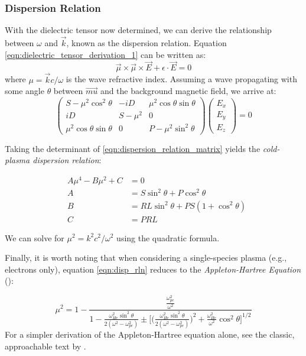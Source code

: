 \subsubsection{Dispersion Relation}
With the dielectric tensor now determined, we can derive the relationship between $\omega$ and $\vec{k}$, known as the dispersion relation. Equation \ref{eqn:dielectric_tensor_derivation_1} can be written as:
\begin{equation}
\vec{\mu}\times \vec{\mu} \times \vec{E} +  \epsilon\cdot\vec{E} = 0
\end{equation}
where $\mu = \vec{k}c/\omega$ is the wave refractive index. Assuming a wave propagating with some angle $\theta$ between $\vec{mu}$ and the background magnetic field, we arrive at:
\begin{equation}
\begin{pmatrix}
S - \mu^2\cos^2\theta & -iD & \mu^2\cos{\theta}\sin{\theta} \\
iD & S - \mu^2 & 0 \\
\mu^2\cos{\theta}\sin{\theta} & 0 & P - \mu^2\sin^2{\theta} \end{pmatrix}\begin{pmatrix}E_x \\ E_y \\ E_z\end{pmatrix} = 0
\label{eqn:dispersion_relation_matrix}
\end{equation}

Taking the determinant of \ref{eqn:dispersion_relation_matrix} yields the \emph{cold-plasma dispersion relation}:

\begin{eqnarray}
&A\mu^4 - B\mu^2 + C &= 0 \label{eqn:disp_rln}  \\
&A& = S \sin^2\theta + P\cos^2\theta \\
&B& = RL\sin^2\theta + PS(1 + \cos^2\theta) \\
&C& = PRL
\end{eqnarray}

We can solve for $\mu^2 = k^2c^2/\omega^2$ using the quadratic formula.

Finally, it is worth noting that when considering a single-species plasma (e.g., electrons only), equation \ref{eqn:disp_rln} reduces to the \emph{Appleton-Hartree Equation} (\cite{Appleton1932}):


\begin{equation}
\mu^2 = 1 - \frac{\frac{\omega_{pe}^2}{\omega^2}}{1 - \frac{\omega_{He}^2\sin^2\theta}{2(\omega^2 - \omega_{pe}^2)} \pm\big[\big(\frac{\omega_{He}^2\sin^2\theta}{2(\omega^2 - \omega_{pe}^2)}\big)^2 + \frac{\omega_{He}^2}{\omega^2}\cos^2\theta\big]^{1/2}}
\end{equation}
For a simpler derivation of the Appleton-Hartree equation alone, see the classic, approachable text by \cite{Chen1983}.

